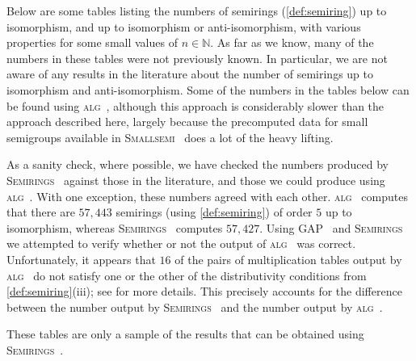 \documentclass{article}
\theoremstyle{definition}
\theoremstyle{plain}
\newcommand{\GAP}{\textsc{GAP}~\cite{GAP4}\xspace}
\newcommand{\Smallsemi}{\textsc{Smallsemi}~\cite{Smallsemi}\xspace}
\newcommand{\Semirings}{\textsc{Semirings}~\cite{Semirings}\xspace}
\newcommand{\alg}{\textsc{alg}~\cite{baueralg}\xspace}
\begin{document}
Below are some tables listing the numbers of semirings (\cref{def:semiring}) up
to isomorphism, and up to isomorphism or anti-isomorphism, with various
properties for some small values of $n\in \mathbb{N}$. As far as we know, many
of the numbers in these tables were not previously known. In particular, we are
not aware of any results in the literature about the number of semirings up to
isomorphism and anti-isomorphism. Some of the numbers in the tables below can
be found using \alg, although this approach is considerably slower
than the approach described here, largely because the precomputed data for
small semigroups available in \Smallsemi does a lot of the heavy lifting.

As a sanity check, where possible, we have checked the numbers produced by
\Semirings against those in the literature, and those we could produce using
\alg. With one exception, these numbers agreed with each other. \alg computes
that there are $57,443$ semirings (using \cref{def:semiring}) of order $5$ up
to isomorphism, whereas \Semirings computes $57,427$. Using \GAP and \Semirings
we attempted to verify whether or not the output of \alg was correct.
Unfortunately, it appears that $16$ of the pairs of multiplication tables
output by \alg do not satisfy one or the other of the distributivity conditions
from \cref{def:semiring}(iii); see \cite{bauer_alg_issue16} for more details.
This precisely accounts for the difference between the number output by
\Semirings and the number output by \alg.

These tables are only a sample of the results that can be obtained
using \Semirings.
\end{document}
